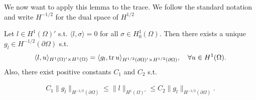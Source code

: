 \documentclass[../main.tex]{subfiles}
\begin{document}
We now want to apply this lemma to the trace. 
We follow the standard notation and write $H^{-1/2}$ for the dual space of 
$H^{1/2}$
\begin{proposition}\label{prop:existence_gl_in_H12}
    Let $l \in H^1(\Omega)'$ s.t. $\langle l, \sigma \rangle = 0$
    for all $\sigma \in H^1_0(\Omega)$. Then there exists a unique
    $g_l \in H^{-1/2}(\partial \Omega)$ s.t.
    \begin{align}
        \langle l, u \rangle_{H^1(\Omega)' \times H^1(\Omega)} 
        = \langle g_l, \operatorname{tr} u \rangle_{H^{1/2}(\partial \Omega)' \times H^{1/2}(\partial \Omega)}, 
            \quad \forall u \in H^1(\Omega). \label{eq:functional_as_trace_inner_product}
    \end{align}
    Also, there exist positive constants $C_1$ and $C_2$ s.t.
    
    \begin{align*}
        C_1 \lVert g_l \rVert _{H^{-1/2}(\partial \Omega)} \leq  \lVert l \rVert _{H^1(\Omega)'}
        \leq C_2 \lVert g_l \rVert _{H^{-1/2}(\partial \Omega)}.            
    \end{align*}
\end{proposition}
\end{document}
